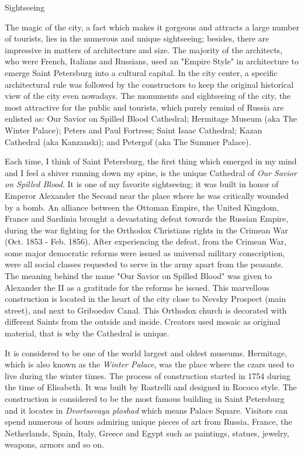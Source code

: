 \documentclass[10pt,a4paper]{article} %
\newcommand{\NewsItem}[1]{ %
\usefont{T1}{fvs}{n}{n} %
\vspace{24pt}\large #1\vspace{3pt} %
\par \normalsize \normalfont}
\begin{document}
\begin{multicols}{3} %

\NewsItem{Sightseeing}
The magic of the city, a fact which makes it gorgeous and attracts 
a large number of tourists, lies in the numerous and unique sightseeing; 
besides, there are impressive in matters of architecture and size. 
The majority of the architects, who were French, Italians and Russians, 
used an "Empire Style" in architecture to emerge Saint Petersburg 
into a cultural capital. 
In the city center, a specific architectural rule was followed 
by the constructors to keep the original historical view of the city even nowadays. 
The monuments and sightseeing of the city, the most attractive for the public and tourists, 
which purely remind of Russia are enlisted as: Our Savior on Spilled Blood Cathedral; 
Hermitage Museum (aka The Winter Palace); Peters and Paul Fortress; Saint Isaac Cathedral; 
Kazan Cathedral (aka Kanzanski); and Petergof (aka The Summer Palace).

Each time, I think of Saint Petersburg, the first thing which emerged in my mind and 
I feel a shiver running down my spine, is the unique Cathedral 
of \textit{Our Savior on Spilled Blood}. 
It is one of my favorite sightseeing; it was built in honor of Emperor Alexander 
the Second near the place where he was critically wounded by a bomb. 
An alliance between the Ottoman Empire, the United Kingdom, 
France and Sardinia brought a devastating defeat towards the Russian Empire, 
during the war fighting for the Orthodox Christians rights in the Crimean War 
(Oct. 1853 - Feb. 1856). 
After experiencing the defeat, from the Crimean War, 
some major democratic reforms were issued as universal military conscription, 
were all social classes requested to serve in the army apart from the peasants. 
The meaning behind the name "Our Savior on Spilled Blood" was given to 
Alexander the II as a gratitude for the reforms he issued. 
This marvellous construction is located in the heart of the city close 
to Nevsky Prospect (main street), and next to Griboedov Canal. 
This Orthodox church is decorated with different Saints from the outside and inside. 
Creators used mosaic as original material, that is why the Cathedral is unique.

It is considered to be one of the world largest and oldest museums. 
Hermitage, which is also known as the \textit{Winter Palace}, 
was the place where the czars used to live during the winter times. 
The process of construction started in 1754 during the time of Elisabeth. 
It was built by Rastrelli and designed in Rococo style. 
The construction is considered to be the most famous building in Saint Petersburg 
and it locates in \textit{Dvortsovaya ploshad} which means Palace Square. 
Visitors can spend numerous of hours admiring unique pieces of art from Russia, France, 
the Netherlands, Spain, Italy, Greece and Egypt such as paintings, statues, 
jewelry, weapons, armors and so on.


\end{multicols}
\end{document}
